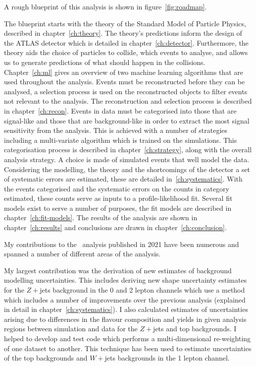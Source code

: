 A rough blueprint of this analysis is shown in figure~\ref{fig:roadmap}.%

The blueprint starts with the theory of the Standard Model of Particle Physics,
described in chapter~\ref{ch:theory}. The theory's predictions inform the
design of the ATLAS detector which is detailed in chapter~\ref{ch:detector}.
Furthermore, the theory aids the choice of particles to collide, which events to
analyse, and allows us to generate predictions of what should happen in the
collisions. Chapter~\ref{ch:ml} gives an overview of two machine learning
algorithms that are used throughout the analysis. Events must be reconstructed
before they can be analysed, a selection process is used on the reconstructed
objects to filter events not relevant to the analysis. The reconstruction and
selection process is described in chapter~\ref{ch:recon}. Events in data must
be categorised into those that are signal-like and those that are
background-like in order to extract the most signal sensitivity from the
analysis. This is achieved with a number of strategies including a multi-variate
algorithm which is trained on the simulations. This categorisation process is
described in chapter~\ref{ch:strategy}, along with the overall analysis
strategy. A choice is made of simulated events that well model the data.
Considering the modelling, the theory and the shortcomings of the detector a set
of systematic errors are estimated, these are detailed in~\ref{ch:systematics}.
With the events categorised and the systematic errors on the counts in category
estimated, these counts serve as inputs to a profile-likelihood fit. Several fit
models exist to serve a number of purposes, the fit models are described in
chapter~\ref{ch:fit-models}. The results of the analysis are shown in
chapter~\ref{ch:results} and conclusions are drawn in
chapter~\ref{ch:conclusion}.


My contributions to the \VHbb\ analysis published in 2021 have been numerous and
spanned a number of different areas of the analysis.

My largest contribution was the derivation of new estimates of background
modelling uncertainties. This includes deriving new shape uncertainty estimates
for the $Z+$jets background in the 0 and 2 lepton channels which use a method
which includes a number of improvements over the previous analysis (explained in
detail in chapter~\ref{ch:systematics}). I also calculated estimates of
uncertainties arising due to differences in the flavour composition and yields
in given analysis regions between simulation and data for the $Z+$jets and top
backgrounds. I helped to develop and test code which performs a
multi-dimensional re-weighting of one dataset to another. This technique has
been used to estimate uncertainties of the top backgrounds and $W+$jets
backgrounds in the 1 lepton channel.

